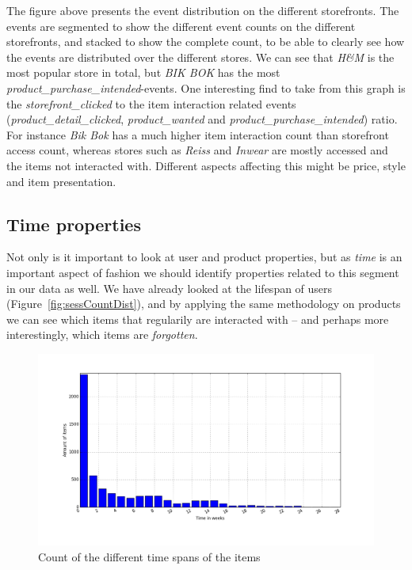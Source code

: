 The figure above presents the event distribution on the different storefronts.
The events are segmented to show the different event counts on the different
storefronts, and stacked to show the complete count, to be able to clearly see
how the events are distributed over the different stores.  We can see that
\emph{H\&M} is the most popular store in total, but \emph{BIK BOK} has the most
\emph{product\_purchase\_intended}-events.  One interesting find to take from
this graph is the \emph{storefront\_clicked} to the item interaction related
events (\emph{product\_detail\_clicked}, \emph{product\_wanted} and
\emph{product\_purchase\_intended}) ratio.  For instance \emph{Bik Bok} has a
much higher item interaction count than storefront access count, whereas stores
such as \emph{Reiss} and \emph{Inwear} are mostly accessed and the items not
interacted with.  Different aspects affecting this might be price, style and
item presentation.

\subsection{Time properties}

Not only is it important to look at user and product properties, but as
\textit{time} is an important aspect of fashion we should identify properties
related to this segment in our data as well. We have already looked at the
lifespan of users (Figure~\ref{fig:sessCountDist}), and by applying the same
methodology on products we can see which items that regularily are interacted
with -- and perhaps more interestingly, which items are \textit{forgotten}.

\begin{figure}[H]
  \centering
  \includegraphics[width=5in]{image/itemTimespansdistribution.png}
  \caption{Count of the different time spans of the items}
  \label{figure:itemLifes}
\end{figure}


